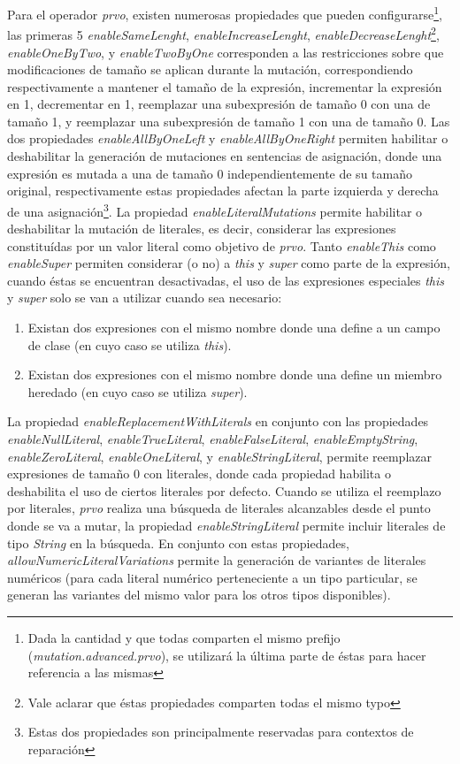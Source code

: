 Para el operador \emph{prvo}, existen numerosas propiedades que pueden configurarse\footnote{Dada la cantidad y que todas comparten el mismo prefijo (\emph{mutation.advanced.prvo}), se utilizar\'a la \'ultima parte de \'estas para hacer referencia a las mismas}, las primeras 5 \emph{enableSameLenght}, \emph{enableIncreaseLenght}, \emph{enableDecreaseLenght}\footnote{Vale aclarar que \'estas propiedades comparten todas el mismo typo}, \emph{enableOneByTwo}, y \emph{enableTwoByOne} corresponden a las restricciones sobre que modificaciones de tama\~no se aplican durante la mutaci\'on, correspondiendo respectivamente a mantener el tama\~no de la expresi\'on, incrementar la expresi\'on en 1, decrementar en 1, reemplazar una subexpresi\'on de tama\~no 0 con una de tama\~no 1, y reemplazar una subexpresi\'on de tama\~no 1 con una de tama\~no 0. Las dos propiedades \emph{enableAllByOneLeft} y \emph{enableAllByOneRight} permiten habilitar o deshabilitar la generaci\'on de mutaciones en sentencias de asignaci\'on, donde una expresi\'on es mutada a una de tama\~no 0 independientemente de su tama\~no original, respectivamente estas propiedades afectan la parte izquierda y derecha de una asignaci\'on\footnote{Estas dos propiedades son principalmente reservadas para contextos de reparaci\'on}. La propiedad \emph{enableLiteralMutations} permite habilitar o deshabilitar la mutaci\'on de literales, es decir, considerar las expresiones constitu\'idas por un valor literal como objetivo de \emph{prvo}. Tanto \emph{enableThis} como \emph{enableSuper} permiten considerar (o no) a \emph{this} y \emph{super} como parte de la expresi\'on, cuando \'estas se encuentran desactivadas, el uso de las expresiones especiales \emph{this} y \emph{super} solo se van a utilizar cuando sea necesario:
\begin{enumerate}[leftmargin=.75cm,align=left,style=nextline]
	\item Existan dos expresiones con el mismo nombre donde una define a un campo de clase (en cuyo caso se utiliza \emph{this}).
	
	\item Existan dos expresiones con el mismo nombre donde una define un miembro heredado (en cuyo caso se utiliza \emph{super}).
\end{enumerate}
La propiedad \emph{enableReplacementWithLiterals} en conjunto con las propiedades \emph{enableNullLiteral}, \emph{enableTrueLiteral}, \emph{enableFalseLiteral}, \emph{enableEmptyString}, \emph{enableZeroLiteral}, \emph{enableOneLiteral}, y \emph{enableStringLiteral}, permite reemplazar expresiones de tama\~no 0 con literales, donde cada propiedad habilita o deshabilita el uso de ciertos literales por defecto. Cuando se utiliza el reemplazo por literales, \emph{prvo} realiza una b\'usqueda de literales alcanzables desde el punto donde se va a mutar, la propiedad \emph{enableStringLiteral} permite incluir literales de tipo \emph{String} en la b\'usqueda. En conjunto con estas propiedades, \emph{allowNumericLiteralVariations} permite la generaci\'on de variantes de literales num\'ericos (para cada literal num\'erico perteneciente a un tipo particular, se generan las variantes del mismo valor para los otros tipos disponibles).

